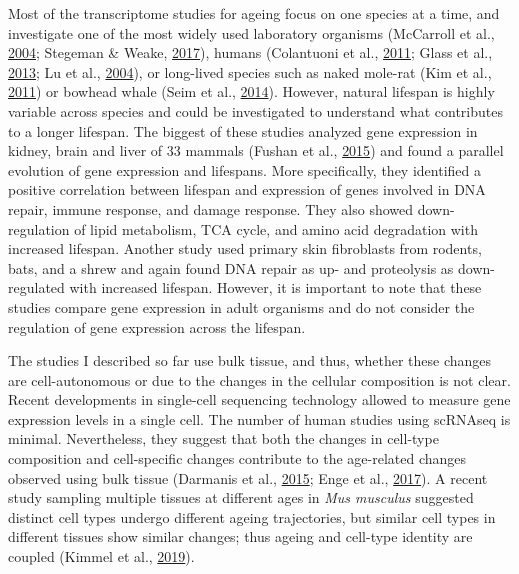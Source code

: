 \documentclass[12pt,twoside]{unicam}
\begin{document}
Most of the transcriptome studies for ageing focus on one species at a time, and investigate one of the most widely used laboratory organisms (McCarroll et al., \protect\hyperlink{ref-McCarroll2004}{2004}; Stegeman \& Weake, \protect\hyperlink{ref-Stegeman2017}{2017}), humans (Colantuoni et al., \protect\hyperlink{ref-Colantuoni2011}{2011}; Glass et al., \protect\hyperlink{ref-Glass2013}{2013}; Lu et al., \protect\hyperlink{ref-Lu2004}{2004}), or long-lived species such as naked mole-rat (Kim et al., \protect\hyperlink{ref-Kim2011}{2011}) or bowhead whale (Seim et al., \protect\hyperlink{ref-Seim2014}{2014}). However, natural lifespan is highly variable across species and could be investigated to understand what contributes to a longer lifespan. The biggest of these studies analyzed gene expression in kidney, brain and liver of 33 mammals (Fushan et al., \protect\hyperlink{ref-Fushan2015}{2015}) and found a parallel evolution of gene expression and lifespans. More specifically, they identified a positive correlation between lifespan and expression of genes involved in DNA repair, immune response, and damage response. They also showed down-regulation of lipid metabolism, TCA cycle, and amino acid degradation with increased lifespan. Another study used primary skin fibroblasts from rodents, bats, and a shrew and again found DNA repair as up- and proteolysis as down-regulated with increased lifespan. However, it is important to note that these studies compare gene expression in adult organisms and do not consider the regulation of gene expression across the lifespan.

The studies I described so far use bulk tissue, and thus, whether these changes are cell-autonomous or due to the changes in the cellular composition is not clear. Recent developments in single-cell sequencing technology allowed to measure gene expression levels in a single cell. The number of human studies using scRNAseq is minimal. Nevertheless, they suggest that both the changes in cell-type composition and cell-specific changes contribute to the age-related changes observed using bulk tissue (Darmanis et al., \protect\hyperlink{ref-Darmanis2015}{2015}; Enge et al., \protect\hyperlink{ref-Enge2017}{2017}). A recent study sampling multiple tissues at different ages in \emph{Mus musculus} suggested distinct cell types undergo different ageing trajectories, but similar cell types in different tissues show similar changes; thus ageing and cell-type identity are coupled (Kimmel et al., \protect\hyperlink{ref-Kimmel2019}{2019}).
\end{document}
